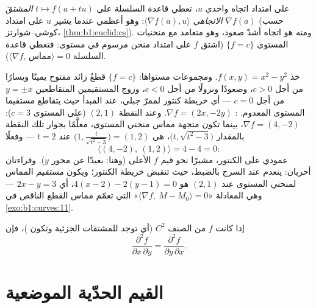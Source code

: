 \begin{remark}
على امتداد اتجاه واحدي $u$، تعطي قاعدة السلسلة على $t \mapsto f(a + tu)$
\emph{المشتقَ الاتجاهي} $\langle \nabla f(a),
u\rangle$: وهو أعظمي عندما يشير $u$ على امتداد $\nabla f(a)$ (حسب
كوشي--شوارتز، \cref{thm:b1:euclid:cs}). ومنه  هو
اتجاه أشدّ صعود، وهو متعامد مع منحنيات
المستوى $\{f = c\}$ (اشتق $f$ على امتداد منحن مرسوم في
 مستوى: فتعطي قاعدة السلسلة $\langle\nabla f,\,
\text{مماس}\rangle = 0$).
\end{remark}

\begin{example}
\label{ex:b1:multivar:levelcurves}
خذ $f(x, y) = x^2 - y^2$. ومجموعات مستواها: $\{f = c\}$ قطعٌ
زائد مفتوح يمينًا ويسارًا من أجل $c > 0$، وصعودًا ونزولًا من أجل $c < 0$،
وزوج المستقيمين المتقاطعين $y = \pm x$ من أجل $c = 0$ --- أي
خريطة كنتور لممرّ جبلي،  عند
المبدأ حيث يتقاطع مستقيما المستوى المعدوم. : $\nabla
f = (2x, -2y)$. وعند النقطة $(2, 1)$ (على المستوى $c = 3$):
$\nabla f = (4, -2)$، بينما تكون متجهة مماس منحني
المستوى، معلَّمًا بجوار تلك النقطة بالمقدار $\bigl(t,
\sqrt{t^2 - 3}\bigr)$، هي $\bigl(1, \frac{t}{\sqrt{t^2 -
3}}\bigr) = (1, 2)$ عند $t = 2$ --- وفعلًا
\[
\langle (4, -2),\ (1, 2)\rangle = 4 - 4 = 0 :
\]
 عمودي على الكنتور، مشيرًا نحو قيم
$f$ الأعلى (وهنا: بعيدًا عن محور $y$). وقراءتان
أخريان: ينعدم  عند السرج بالضبط، حيث
تنقبض خريطة الكنتور؛ ويكون \emph{مستقيم} المماس لمنحني
المستوى عند $(2,1)$ هو $4(x - 2) - 2(y - 1) = 0$، أي $2x -
y = 3$ --- وهي المعادلة «$\langle \nabla f,\ M - M_0\rangle =
0$» التي تعمّم مماس القطع الناقص في
\cref{exo:b1:curves:11}.
\end{example}

\begin{theorem}[شوارتز]\label{thm:b1:multivar:schwarz}
إذا كانت $f$ من الصنف $C^2$ (أي توجد  للمشتقات الجزئية
وتكون )، فإن
\[
\frac{\partial^2 f}{\partial x\,\partial y}
= \frac{\partial^2 f}{\partial y\,\partial x} .
\]
\end{theorem}
\admitted

\section{القيم الحدّية الموضعية}


